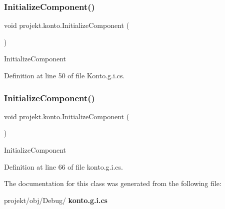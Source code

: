 \subsubsection{Initialize\+Component()\hspace{0.1cm}{\footnotesize\ttfamily [1/2]}}
{\footnotesize\ttfamily void projekt.\+konto.\+Initialize\+Component (\begin{DoxyParamCaption}{ }\end{DoxyParamCaption})\hspace{0.3cm}{\ttfamily [inline]}}



Initialize\+Component 



Definition at line 50 of file Konto.\+g.\+i.\+cs.

\mbox{\label{classprojekt_1_1konto_a7747c72ea9656125d46223a6930f86cf}} 
\subsubsection{Initialize\+Component()\hspace{0.1cm}{\footnotesize\ttfamily [2/2]}}
{\footnotesize\ttfamily void projekt.\+konto.\+Initialize\+Component (\begin{DoxyParamCaption}{ }\end{DoxyParamCaption})\hspace{0.3cm}{\ttfamily [inline]}}



Initialize\+Component 



Definition at line 66 of file konto.\+g.\+i.\+cs.



The documentation for this class was generated from the following file\+:\begin{DoxyCompactItemize}
\item 
projekt/obj/\+Debug/\textbf{ konto.\+g.\+i.\+cs}\end{DoxyCompactItemize}
